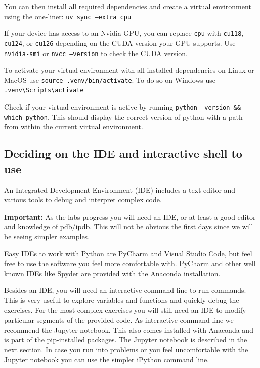 You can then install all required dependencies and create a virtual environment using the one-liner: \newline
\texttt{uv sync --extra cpu} \newline

If your device has access to an Nvidia GPU, you can replace \texttt{cpu} with \texttt{cu118}, \texttt{cu124}, or \texttt{cu126} depending on the CUDA version your GPU supports.
Use \texttt{nvidia-smi} or \texttt{nvcc --version} to check the CUDA version.

To activate your virtual environment with all installed dependencies on Linux or MacOS use \texttt{source .venv/bin/activate}.
To do so on Windows use \texttt{.venv\textbackslash Scripts\textbackslash activate}

Check if your virtual environment is active by running \texttt{python --version \&\& which python}. This should display the correct version of python with a path from within the current virtual environment.


\subsection{Deciding on the IDE and interactive shell to use}

An Integrated Development Environment (IDE) includes a text editor and various tools to debug and interpret complex code. 

\textbf{Important:} As the labs progress you will need an IDE, or at least a good editor and knowledge of pdb/ipdb. This will not be obvious the first days since we will be seeing simpler examples.

Easy IDEs to work with Python are PyCharm and Visual Studio Code, but feel free to use the software you feel more comfortable with. PyCharm and other well known IDEs like Spyder are provided with the Anaconda installation.

Besides an IDE, you will need an interactive command line to run commands. This is very useful to explore variables and functions and quickly debug the exercises. For the most complex exercises you will still need an IDE to modify particular segments of the provided code. As interactive command line we recommend the Jupyter notebook. This also comes installed with Anaconda and is part of the pip-installed packages. The Jupyter notebook is described in the next section. In case you run into problems or you feel uncomfortable with the Jupyter notebook you can use the simpler iPython command line.

